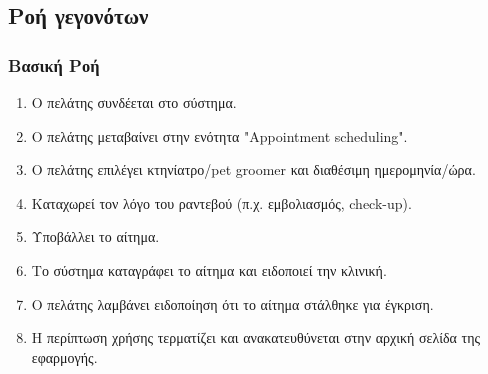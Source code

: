 \documentclass[12pt,a4paper,twoside]{book}
\begin{document}
\subsection{Ροή γεγονότων}

\subsubsection{Βασική Ροή}
\begin{enumerate}
  \item Ο πελάτης συνδέεται στο σύστημα. %
  \item Ο πελάτης μεταβαίνει στην ενότητα "Appointment scheduling". %
  \item Ο πελάτης επιλέγει κτηνίατρο/pet groomer και διαθέσιμη ημερομηνία/ώρα. %
  \item Καταχωρεί τον λόγο του ραντεβού (π.χ. εμβολιασμός, check-up). %
  \item Υποβάλλει το αίτημα.  %
  \item Το σύστημα καταγράφει το αίτημα και ειδοποιεί την κλινική. %
  \item Ο πελάτης λαμβάνει ειδοποίηση ότι το αίτημα στάλθηκε για έγκριση. %
  \item Η περίπτωση χρήσης τερματίζει και ανακατευθύνεται στην αρχική σελίδα της εφαρμογής. %
\end{enumerate}
\end{document}
